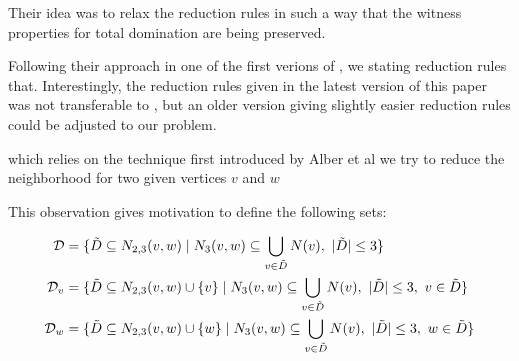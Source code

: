 Their idea was to relax the reduction rules in such a way that the witness properties for total domination are being preserved.

Following their approach in one of the first verions of \cite{Garnero2014}, we stating reduction rules that. Interestingly, the reduction rules given in the latest version of this paper was not transferable to \sdom, but an older version giving slightly easier reduction rules could be adjusted to our problem.

which relies on the technique first introduced by Alber et al we try to reduce the neighborhood for two given vertices $v$ and $w$

This observation gives motivation to define the following sets:

\begin{align}
    \mathcal{D} &= \{ \tilde D \subseteq N_{2,3}(v,w)            \mid N_3(v,w) \subseteq \bigcup_{v \in \tilde D} N(v),\ |\tilde D| \leq 3                  \}\\
    \mathcal{D}_{v}  &= \{ \tilde D \subseteq N_{2,3}(v,w) \cup \{v\} \mid N_3(v,w) \subseteq \bigcup_{v \in \tilde D} N(v),\ |\tilde D| \leq 3,\ v \in \tilde D \}\\
    \mathcal{D}_{w}  &= \{ \tilde D \subseteq N_{2,3}(v,w) \cup \{w\} \mid N_3(v,w) \subseteq \bigcup_{v \in \tilde D} N(v),\ |\tilde D| \leq 3,\ w \in \tilde D \}
    \end{align}




